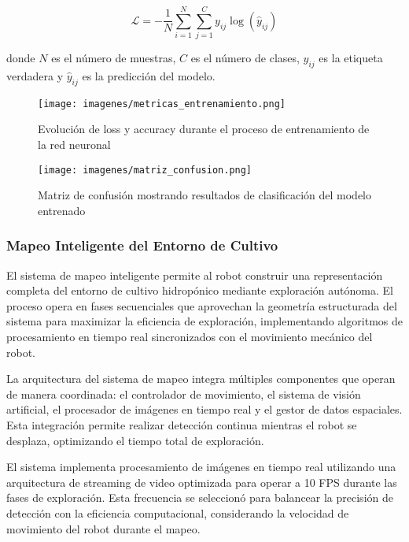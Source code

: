 \begin{equation}
\mathcal{L} = -\frac{1}{N} \sum_{i=1}^{N} \sum_{j=1}^{C} y_{ij} \log(\hat{y}_{ij})
\end{equation}

donde $N$ es el número de muestras, $C$ es el número de clases, $y_{ij}$ es la etiqueta verdadera y $\hat{y}_{ij}$ es la predicción del modelo.

\begin{figure}[h]
\centering
\texttt{[image: imagenes/metricas\_entrenamiento.png]}
\caption{Evolución de loss y accuracy durante el proceso de entrenamiento de la red neuronal}
\label{fig:metricas_entrenamiento}
\end{figure}

\begin{figure}[h]
\centering
\texttt{[image: imagenes/matriz\_confusion.png]}
\caption{Matriz de confusión mostrando resultados de clasificación del modelo entrenado}
\label{fig:matriz_confusion}
\end{figure}

\subsubsection{Mapeo Inteligente del Entorno de Cultivo}

El sistema de mapeo inteligente permite al robot construir una representación completa del entorno de cultivo hidropónico mediante exploración autónoma. El proceso opera en fases secuenciales que aprovechan la geometría estructurada del sistema para maximizar la eficiencia de exploración, implementando algoritmos de procesamiento en tiempo real sincronizados con el movimiento mecánico del robot.

La arquitectura del sistema de mapeo integra múltiples componentes que operan de manera coordinada: el controlador de movimiento, el sistema de visión artificial, el procesador de imágenes en tiempo real y el gestor de datos espaciales. Esta integración permite realizar detección continua mientras el robot se desplaza, optimizando el tiempo total de exploración.

El sistema implementa procesamiento de imágenes en tiempo real utilizando una arquitectura de streaming de video optimizada para operar a 10 FPS durante las fases de exploración. Esta frecuencia se seleccionó para balancear la precisión de detección con la eficiencia computacional, considerando la velocidad de movimiento del robot durante el mapeo.

